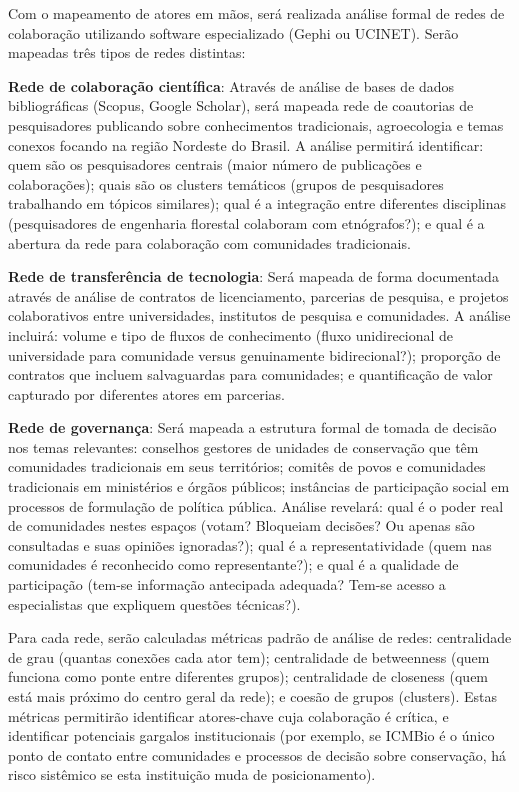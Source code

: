 Com o mapeamento de atores em mãos, será realizada análise formal de redes de colaboração utilizando software especializado (Gephi ou UCINET). Serão mapeadas três tipos de redes distintas:

\textbf{Rede de colaboração científica}: Através de análise de bases de dados bibliográficas (Scopus, Google Scholar), será mapeada rede de coautorias de pesquisadores publicando sobre conhecimentos tradicionais, agroecologia e temas conexos focando na região Nordeste do Brasil. A análise permitirá identificar: quem são os pesquisadores centrais (maior número de publicações e colaborações); quais são os clusters temáticos (grupos de pesquisadores trabalhando em tópicos similares); qual é a integração entre diferentes disciplinas (pesquisadores de engenharia florestal colaboram com etnógrafos?); e qual é a abertura da rede para colaboração com comunidades tradicionais.

\textbf{Rede de transferência de tecnologia}: Será mapeada de forma documentada através de análise de contratos de licenciamento, parcerias de pesquisa, e projetos colaborativos entre universidades, institutos de pesquisa e comunidades. A análise incluirá: volume e tipo de fluxos de conhecimento (fluxo unidirecional de universidade para comunidade versus genuinamente bidirecional?); proporção de contratos que incluem salvaguardas para comunidades; e quantificação de valor capturado por diferentes atores em parcerias.

\textbf{Rede de governança}: Será mapeada a estrutura formal de tomada de decisão nos temas relevantes: conselhos gestores de unidades de conservação que têm comunidades tradicionais em seus territórios; comitês de povos e comunidades tradicionais em ministérios e órgãos públicos; instâncias de participação social em processos de formulação de política pública. Análise revelará: qual é o poder real de comunidades nestes espaços (votam? Bloqueiam decisões? Ou apenas são consultadas e suas opiniões ignoradas?); qual é a representatividade (quem nas comunidades é reconhecido como representante?); e qual é a qualidade de participação (tem-se informação antecipada adequada? Tem-se acesso a especialistas que expliquem questões técnicas?).

Para cada rede, serão calculadas métricas padrão de análise de redes: centralidade de grau (quantas conexões cada ator tem); centralidade de betweenness (quem funciona como ponte entre diferentes grupos); centralidade de closeness (quem está mais próximo do centro geral da rede); e coesão de grupos (clusters). Estas métricas permitirão identificar atores-chave cuja colaboração é crítica, e identificar potenciais gargalos institucionais (por exemplo, se ICMBio é o único ponto de contato entre comunidades e processos de decisão sobre conservação, há risco sistêmico se esta instituição muda de posicionamento).

